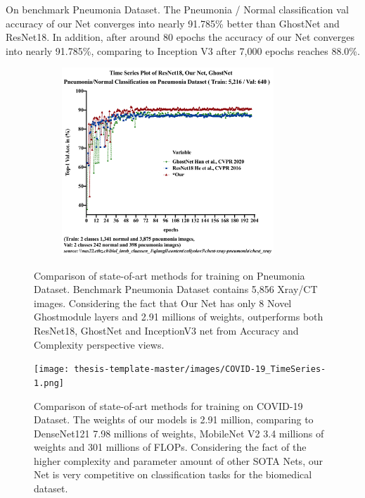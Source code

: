 On benchmark Pneumonia Dataset\cite{b38}. The Pneumonia / Normal classification val accuracy of our Net converges into nearly 91.785\% better than GhostNet and ResNet18. In addition, after around 80 epochs the accuracy of our Net converges into nearly 91.785\%, comparing to  Inception V3 after 7,000 epochs reaches 88.0\%\cite{b38}.
\begin{figure}[h]
\centering
\includegraphics[height=200pt, width=0.9\textwidth]{thesis-template-master/images/Pneumonia_TimeSeries-1.png}
\label{fig}
\centering
\caption{ Comparison of state-of-art methods for training on Pneumonia Dataset. Benchmark Pneumonia Dataset contains 5,856 Xray/CT images. Considering the fact that Our Net has only 8 Novel Ghostmodule layers and 2.91 millions of weights, outperforms both ResNet18, GhostNet and InceptionV3 net from Accuracy and Complexity perspective views.}
\end{figure}

\begin{figure}[h]
\centering
\texttt{[image: thesis-template-master/images/COVID-19\_TimeSeries-1.png]}
\label{fig}
\centering
\caption{ Comparison of state-of-art methods for training on COVID-19 Dataset.  The weights of our models is 2.91 million, comparing to DenseNet121 7.98 millions of weights, MobileNet V2 3.4 millions of weights and 301 millions of FLOPs. Considering the fact of the higher complexity and parameter amount of other SOTA Nets, our Net is very competitive on classification tasks for the biomedical dataset. }
\end{figure}


